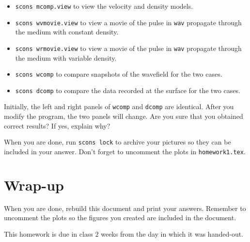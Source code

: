 \begin{enumerate}
\begin{itemize}

\item \texttt{scons mcomp.view} to view the velocity and density models.

\item \texttt{scons wvmovie.view} to view a movie of the pulse in
\texttt{wav} propagate through the medium with constant density.

\item \texttt{scons wrmovie.view} to view a movie of the pulse in
\texttt{wav} propagate through the medium with variable density.

\item \texttt{scons wcomp} to compare snapshots of the wavefield
for the two cases.

\item \texttt{scons dcomp} to compare the data recorded at the surface
for the two cases.

\end{itemize}

Initially, the left and right panels of \texttt{wcomp} and 
\texttt{dcomp} are identical. After you modify the program, the 
two panels will change. Are you sure that you obtained correct 
results? If yes, explain why?

\end{enumerate}

When you are done, run \texttt{scons lock} to archive your pictures 
so they can be included in your answer.
Don't forget to uncomment the plots in \texttt{homework1.tex}.



\section{Wrap-up}

When you are done, rebuild this document and 
print your answers. Remember to uncomment the plots
so the figures you created are included in the document.

This homework is due in class $2$ weeks
from the day in which it was handed-out.


